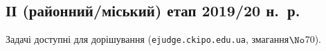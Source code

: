  \renewenvironment{problemAllDefault}[1]{\vspace{10mm}\par\begin{problem}{#1}{\stdinOrInputTxt}{\stdoutOrOutputTxt}{1 сек}{256 мегабайтів}}{\end{problem}}

\subsection{ІІ (районний/міський) етап 2019/20 н.~р.}

Задачі доступні для дорішування (\verb"ejudge.ckipo.edu.ua", змагання\nolinebreak[3] $\No$70).



	

	

	

	


\ERROR %